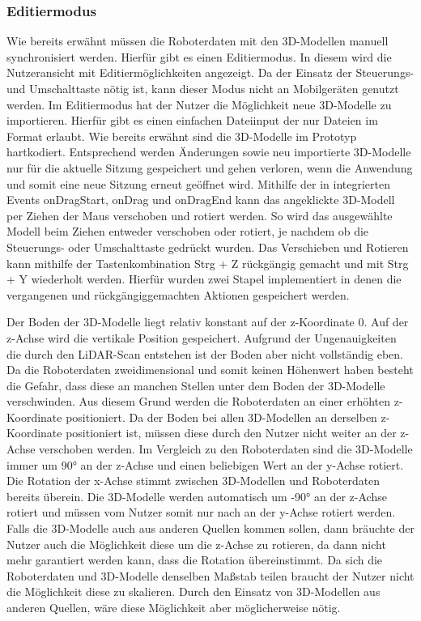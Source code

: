 \subsubsection{Editiermodus}
Wie bereits erwähnt müssen die Roboterdaten mit den 3D-Modellen manuell synchronisiert werden. Hierfür gibt es einen Editiermodus. In diesem wird die Nutzeransicht mit Editiermöglichkeiten angezeigt. Da der Einsatz der Steuerungs- und Umschalttaste nötig ist, kann dieser Modus nicht an Mobilgeräten genutzt werden. Im Editiermodus hat der Nutzer die Möglichkeit neue 3D-Modelle zu importieren. Hierfür gibt es einen einfachen Dateiinput der nur Dateien im \glb{} Format erlaubt. Wie bereits erwähnt sind die 3D-Modelle im Prototyp hartkodiert. Entsprechend werden Änderungen sowie neu importierte 3D-Modelle nur für die aktuelle Sitzung gespeichert und gehen verloren, wenn die Anwendung und somit eine neue Sitzung erneut geöffnet wird. Mithilfe der in \deckgl{} integrierten Events onDragStart, onDrag und onDragEnd kann das angeklickte 3D-Modell per Ziehen der Maus verschoben und rotiert werden.
So wird das ausgewählte Modell beim Ziehen entweder verschoben oder rotiert, je nachdem ob die Steuerungs- oder Umschalttaste gedrückt wurden. Das Verschieben und Rotieren kann mithilfe der Tastenkombination Strg + Z rückgängig gemacht und mit Strg + Y wiederholt werden. Hierfür wurden zwei Stapel implementiert in denen die vergangenen und rückgängiggemachten Aktionen gespeichert werden.

Der Boden der 3D-Modelle liegt relativ konstant auf der z-Koordinate 0. Auf der z-Achse wird die vertikale Position gespeichert. Aufgrund der Ungenauigkeiten die durch den \ac{LiDAR}-Scan entstehen ist der Boden aber nicht vollständig eben. Da die Roboterdaten zweidimensional und somit keinen Höhenwert haben besteht die Gefahr, dass diese an manchen Stellen unter dem Boden der 3D-Modelle verschwinden. Aus diesem Grund werden die Roboterdaten an einer erhöhten z-Koordinate positioniert. Da der Boden bei allen 3D-Modellen an derselben z-Koordinate positioniert ist, müssen diese durch den Nutzer nicht weiter an der z-Achse verschoben werden. Im Vergleich zu den Roboterdaten sind die 3D-Modelle immer um 90° an der z-Achse und einen beliebigen Wert an der y-Achse rotiert. Die Rotation der x-Achse stimmt zwischen 3D-Modellen und Roboterdaten bereits überein. Die 3D-Modelle werden automatisch um -90° an der z-Achse rotiert und müssen vom Nutzer somit nur nach an der y-Achse rotiert werden. Falls die 3D-Modelle auch aus anderen Quellen kommen sollen, dann bräuchte der Nutzer auch die Möglichkeit diese um die z-Achse zu rotieren, da dann nicht mehr garantiert werden kann, dass die Rotation übereinstimmt. Da sich die Roboterdaten und 3D-Modelle denselben Maßstab teilen braucht der Nutzer nicht die Möglichkeit diese zu skalieren. Durch den Einsatz von 3D-Modellen aus anderen Quellen, wäre diese Möglichkeit aber möglicherweise nötig.

